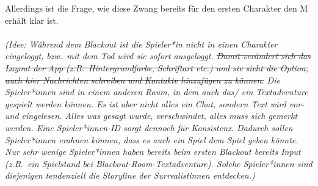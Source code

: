 Allerdings ist die Frage, wie diese Zwang bereits für den ersten Charakter den M
erhält klar ist.\\\\
%
\emph{(Idee: Während dem Blackout ist die Spieler*in nicht in einen Charakter
eingeloggt, bzw.~mit dem Tod wird sie sofort ausgeloggt. \st{Damit verändert sich
das Layout der App (z.B.~Hintergrundfarbe, Schriftart etc.) und sie sieht 
die Option, auch hier Nachrichten schreiben und Kontakte hinzufügen zu können.}
Die Spieler*innen sind in einem anderen Raum, in dem auch das/ ein Textadventure
gespielt werden können. 
Es ist aber nicht alles ein Chat, sondern Text wird vor- und eingelesen. Alles
was gesagt wurde, verschwindet, alles muss sich gemerkt werden. 
Eine Spieler*innen-ID sorgt dennoch für Konsistenz.
Dadurch sollen Spieler*innen erahnen können, dass es auch ein Spiel  
dem Spiel geben könnte. 
Nur sehr wenige Spieler*innen haben bereits beim ersten Blackout bereits Input
(z.B.~ein Spielstand bei Blackout-Room-Textadventure).
Solche Spieler*innen sind diejenigen tendenziell die Storyline der Surrealistinnen 
entdecken.)}

